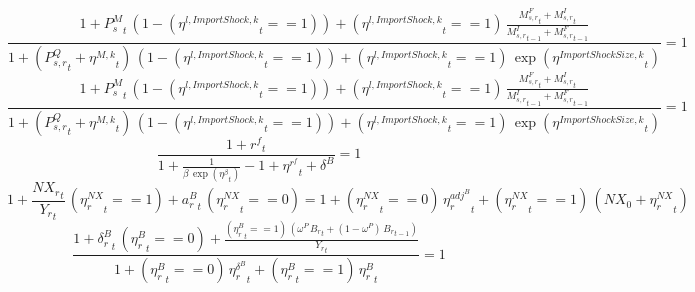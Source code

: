 \noindent[name= `import price 4']
\begin{dmath}
\frac{1+{{P^{M}_s}}_{t}\, \left(1-\left({{\eta^{l,Import Shock,k}}}_{t}==1\right)\right)+\left({{\eta^{l,Import Shock,k}}}_{t}==1\right)\, \frac{{{M^F_{s,r}}}_{t}+{{M^I_{s,r}}}_{t}}{{{M^I_{s,r}}}_{t-1}+{{M^F_{s,r}}}_{t-1}}}{1+\left({{P^Q_{s,r}}}_{t}+{{\eta^{M,k}}}_{t}\right)\, \left(1-\left({{\eta^{l,Import Shock,k}}}_{t}==1\right)\right)+\left({{\eta^{l,Import Shock,k}}}_{t}==1\right)\, \exp\left({{\eta^{Import Shock Size,k}}}_{t}\right)}=1
\end{dmath}
\noindent[name= `import price 5']
\begin{dmath}
\frac{1+{{P^{M}_s}}_{t}\, \left(1-\left({{\eta^{l,Import Shock,k}}}_{t}==1\right)\right)+\left({{\eta^{l,Import Shock,k}}}_{t}==1\right)\, \frac{{{M^F_{s,r}}}_{t}+{{M^I_{s,r}}}_{t}}{{{M^I_{s,r}}}_{t-1}+{{M^F_{s,r}}}_{t-1}}}{1+\left({{P^Q_{s,r}}}_{t}+{{\eta^{M,k}}}_{t}\right)\, \left(1-\left({{\eta^{l,Import Shock,k}}}_{t}==1\right)\right)+\left({{\eta^{l,Import Shock,k}}}_{t}==1\right)\, \exp\left({{\eta^{Import Shock Size,k}}}_{t}\right)}=1
\end{dmath}
\noindent[name= `world interest rate']
\begin{dmath}
\frac{1+{{r^{f}}}_{t}}{1+\frac{1}{{{\beta}}\, \exp\left({{\eta^{\beta}}}_{t}\right)}-1+{{\eta^{r^f}}}_{t}+{{\delta^B}}}=1
\end{dmath}
\noindent[name= `net export to GDP ratio 1']
\begin{dmath}
1+\frac{{{NX_r}}_{t}}{{{Y_r}}_{t}}\, \left({{\eta^{NX}_r}}_{t}==1\right)+{a^B_r}_{t}\, \left({{\eta^{NX}_r}}_{t}==0\right)=1+\left({{\eta^{NX}_r}}_{t}==0\right)\, {{\eta^{adj^B}_r}}_{t}+\left({{\eta^{NX}_r}}_{t}==1\right)\, \left({{NX_0}}+{{\eta^{NX}_r}}_{t}\right)
\end{dmath}
\noindent[name= `world depreciation rate 1']
\begin{dmath}
\frac{1+{{\delta^{B}_r}}_{t}\, \left({{\eta^{B}_r}}_{t}==0\right)+\frac{\left({{\eta^{B}_r}}_{t}==1\right)\, \left({{\omega^{P}}}\, {{B_r}}_{t}+\left(1-{{\omega^{P}}}\right)\, {{B_r}}_{t-1}\right)}{{{Y_r}}_{t}}}{1+\left({{\eta^{B}_r}}_{t}==0\right)\, {{\eta^{\delta^B}_r}}_{t}+\left({{\eta^{B}_r}}_{t}==1\right)\, {{\eta^{B}_r}}_{t}}=1
\end{dmath}
\noindent[name= `FOC foreign bonds 1']
